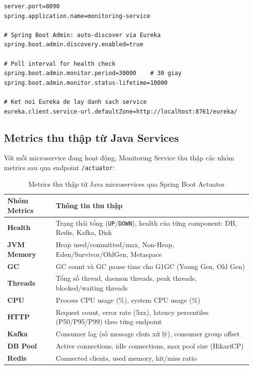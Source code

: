 \documentclass[12pt,a4paper]{report}
\begin{document}
\begin{lstlisting}[style=javaStyle, caption={application.properties của Monitoring Service}, label={lst:monconfig}]
server.port=8090
spring.application.name=monitoring-service

# Spring Boot Admin: auto-discover via Eureka
spring.boot.admin.discovery.enabled=true

# Poll interval for health check
spring.boot.admin.monitor.period=30000    # 30 giay
spring.boot.admin.monitor.status-lifetime=10000

# Ket noi Eureka de lay danh sach service
eureka.client.service-url.defaultZone=http://localhost:8761/eureka/
\end{lstlisting}

\subsection{Metrics thu thập từ Java Services}

Với mỗi microservice đang hoạt động, Monitoring Service thu thập các nhóm metrics sau qua endpoint \texttt{/actuator}:

\begin{table}[H]
\centering
\caption{Metrics thu thập từ Java microservices qua Spring Boot Actuator}
\label{tab:javametrics}
\begin{tabularx}{\textwidth}{lX}
\toprule
\textbf{Nhóm Metrics} & \textbf{Thông tin thu thập} \\
\midrule
\textbf{Health}    & Trạng thái tổng (\texttt{UP}/\texttt{DOWN}), health của từng component: DB, Redis, Kafka, Disk \\
\textbf{JVM Memory}& Heap used/committed/max, Non-Heap, Eden/Survivor/OldGen, Metaspace \\
\textbf{GC}        & GC count và GC pause time cho G1GC (Young Gen, Old Gen) \\
\textbf{Threads}   & Tổng số thread, daemon threads, peak threads, blocked/waiting threads \\
\textbf{CPU}       & Process CPU usage (\%), system CPU usage (\%) \\
\textbf{HTTP}      & Request count, error rate (5xx), latency percentiles (P50/P95/P99) theo từng endpoint \\
\textbf{Kafka}     & Consumer lag (số message chưa xử lý), consumer group offset \\
\textbf{DB Pool}   & Active connections, idle connections, max pool size (HikariCP) \\
\textbf{Redis}     & Connected clients, used memory, hit/miss ratio \\
\bottomrule
\end{tabularx}
\end{table}
\end{document}
